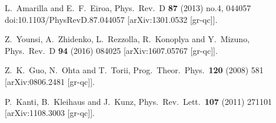 \documentclass[12pt]{article}
\begin{document}
\begin{small}
\begin{thebibliography}{99}
  L.~Amarilla and E.~F.~Eiroa,
  Phys.\ Rev.\ D {\bf 87} (2013) no.4,  044057
  doi:10.1103/PhysRevD.87.044057
  [arXiv:1301.0532 [gr-qc]].




  Z.~Younsi, A.~Zhidenko, L.~Rezzolla, R.~Konoplya and Y.~Mizuno,
  Phys.\ Rev.\ D {\bf 94} (2016)   084025
  [arXiv:1607.05767 [gr-qc]].


  Z.~K.~Guo, N.~Ohta and T.~Torii,
  Prog.\ Theor.\ Phys.\  {\bf 120} (2008) 581
  [arXiv:0806.2481 [gr-qc]].



  P.~Kanti, B.~Kleihaus and J.~Kunz,
  Phys.\ Rev.\ Lett.\  {\bf 107} (2011) 271101
  [arXiv:1108.3003 [gr-qc]].
 

\end{thebibliography}
\end{small}
\end{document}
